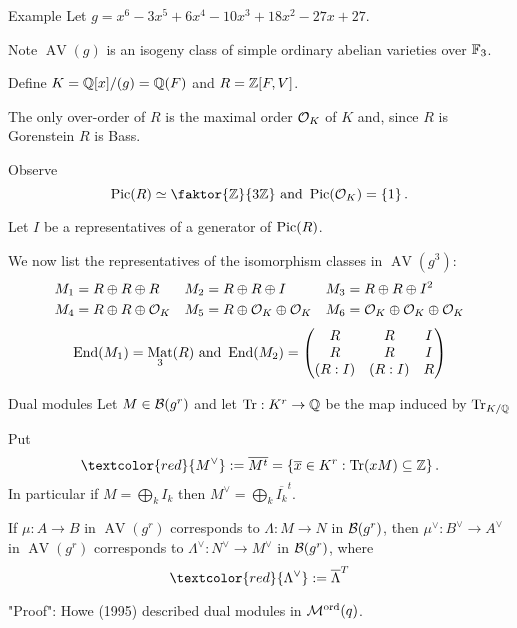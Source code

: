 \documentclass[usenames,dvipsnames,handout]{beamer}
\DeclareMathOperator{\AV}{AV}
\DeclareMathOperator{\Mat}{Mat}
\newcommand{\Modord}[1]{\cM^{\text{ord}}({#1})}
\newcommand{\red}[1]{\textcolor{red}{#1}}
\begin{document}
\begin{frame}{ Example }
   Let $g=x^6 - 3x^5 + 6x^4 - 10x^3 + 18x^2 - 27x + 27$.
   
   \pause Note $\AV(g)$ is an isogeny class of simple ordinary abelian varieties over $\mathbb{F}_3$.
   
   \pause Define $K=\mathbb{Q}[x]/(g)=\mathbb{Q}(F)$ and $R=\mathbb{Z}[F,V]$.
   
   \pause The only over-order of $R$ is the maximal order ${\mathcal O}_K$ of $K$ and, since $R$ is Gorenstein
   $R$ is Bass.
   
   \pause Observe
   \[ \Pic(R) \simeq \faktor{\Z}{3\Z} \text{ and } \Pic(\cO_K)=\set{1}. \]
   
   \pause Let $I$ be a representatives of a generator of $\operatorname{Pic}(R)$.
   
   \pause We now list the representatives of the isomorphism classes in $\AV(g^3)$:
   \begin{align*}
	& M_1=R \oplus R \oplus R &
	& M_2=R \oplus R \oplus I &
	& M_3=R \oplus R \oplus I^2 \\
	& M_4=R \oplus R \oplus {\mathcal O}_K & 
	& M_5=R \oplus {\mathcal O}_K \oplus {\mathcal O}_K & 
	& M_6={\mathcal O}_K \oplus {\mathcal O}_K \oplus {\mathcal O}_K
   \end{align*}
   \pause 
   \[\End(M_1) = \Mat_3(R) \text{ and }
    \End(M_2)=
      \begin{pmatrix}
         R & R & I \\
         R & R & I \\
         (R:I) & (R:I) & R
      \end{pmatrix}\]
\end{frame}

\begin{frame}{ Dual modules }
Let $M \in {\mathcal B}(g^r)$ and let $\operatorname{Tr}:K^r \to \mathbb{Q}$ be the map induced by $\operatorname{Tr}_{K/\mathbb{Q}}$

\pause Put
\[ \red{M^\vee}:=\overline{M^t}=\set{ \overline{x} \in K^r : \Tr(xM)\subseteq \Z }. \]
\pause In particular if $M=\bigoplus_k I_k$ then $M^\vee=\bigoplus_k \overline{I_k}^t$.

\pause
\begin{prop}
 If $\mu:A\to B$ in $\AV(g^r)$ corresponds to $\Lambda:M\to N$ in ${\mathcal B}(g^r)$,
 \pause then $\mu^\vee:B^\vee\to A^\vee$ in $\AV(g^r)$ corresponds to $\Lambda^\vee:N^\vee\to M^\vee$ in ${\mathcal B}(g^r)$,
 where
 \[ \red{\Lambda^\vee} := \overline{\Lambda}^T \]
\end{prop}
"Proof": Howe (1995) described dual modules in $\Modord{q}$.
\end{frame}
\end{document}
